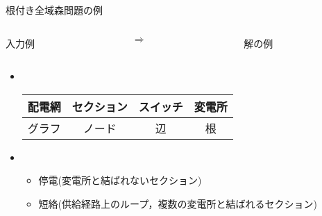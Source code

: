 \begin{frame}{根付き全域森問題の例}
  \begin{columns}
    \begin{column}{0.45\textwidth}\centering
      \begin{exampleblock}{入力例}
	\centering
	
      \end{exampleblock}
    \end{column}
    \begin{column}{0.05\textwidth}\centering
      $\Rightarrow$
    \end{column}
    \begin{column}{0.45\textwidth}\centering
      \begin{exampleblock}{解の例}
        \centering
        
      \end{exampleblock}
    \end{column}
  \end{columns}
  \vfill
  \begin{itemize}
  \item {} \\
	 \begin{center}
      \begin{minipage}[c]{0.7\textwidth}
	   \begin{block}{}
		\centering
		\begin{tabular}{c|ccc}
		配電網 & セクション & スイッチ & 変電所 \\
		\hline
		グラフ & ノード & 辺 & 根
		\end{tabular}
	   \end{block}
      \end{minipage}
	 \end{center}\vfill
   \item {}
		 \begin{itemize}
		  \item 停電(変電所と結ばれないセクション)
		  \item 短絡(供給経路上のループ，複数の変電所と結ばれるセクション)
		 \end{itemize}
  \end{itemize}
\end{frame}

 
